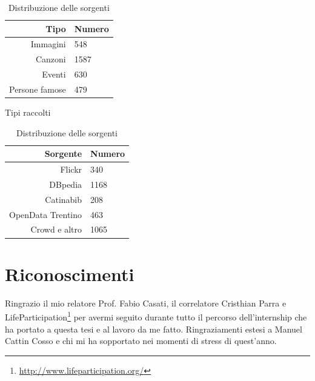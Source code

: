\documentclass{acm_proc_article-sp}
\begin{document}


\begin{table}
\parbox{.45\linewidth}{
\centering
\begin{tabular}{|r|l|}
\hline
Tipo & Numero \\
\hline
Immagini & 548 \\
Canzoni & 1587 \\
Eventi & 630 \\
Persone famose & 479 \\
\hline
\end{tabular}
\caption{Tipi raccolti}
\label{tab:entitykind}
}
\hfill
\parbox{.45\linewidth}{
\centering
\begin{tabular}{|r|l|}
\hline
Sorgente & Numero \\
\hline
Flickr & 340 \\
DBpedia & 1168 \\
Catinabib & 208 \\
OpenData Trentino & 463 \\
Crowd e altro & 1065 \\
\hline
\end{tabular}
\caption{Distribuzione delle sorgenti}
\label{tab:entitysource}
}
\end{table}



\section{Riconoscimenti}
Ringrazio il mio relatore Prof. Fabio Casati, il correlatore Cristhian Parra e LifeParticipation\footnote{\url{http://www.lifeparticipation.org/}} per avermi seguito durante tutto il percorso dell'internship che ha portato a questa tesi e al lavoro da me fatto. Ringraziamenti estesi a Manuel Cattin Cosso e chi mi ha sopportato nei momenti di stress di quest'anno.

%

%
%
\appendix






\balancecolumns
\end{document}
